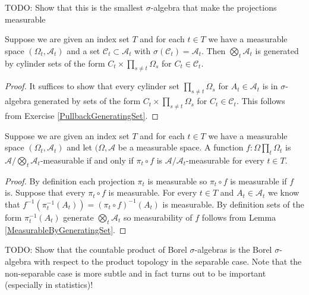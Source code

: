 TODO: Show that this is the smallest $\sigma$-algebra that make the
projections measurable


\begin{prop}\label{GeneratingSetProductSigmaAlgebra}Suppose we are given an index set $T$ and for each $t \in
  T$ we have a measurable space $(\Omega_t, \mathcal{A}_t)$ and a set $\mathcal{C}_t \subset \mathcal{A}_t$ with $\sigma(\mathcal{C}_t) = \mathcal{A}_t$.  
Then $\bigotimes_t \mathcal{A}_t$ is generated by cylinder sets of the form $C_t \times
  \prod_{s \neq t} \Omega_s$ for $C_t \in \mathcal{C}_t$.
\end{prop}
\begin{proof}
It suffices to show that every cylinder set  $\prod_{s \neq t} \Omega_s$ for $A_t \in \mathcal{A}_t$ is in $\sigma$-algebra generated by sets of the form $C_t \times
  \prod_{s \neq t} \Omega_s$ for $C_t \in \mathcal{C}_t$.  This follows from Exercise \ref{PullbackGeneratingSet}.
\end{proof}

\begin{prop}\label{MeasurableFunctionsIntoProductSigmaAlgebra}Suppose we are given an index set $T$ and for each $t \in
  T$ we have a measurable space $(\Omega_t, \mathcal{A}_t)$ and let
  $(\Omega,\mathcal{A}$ be a measurable space.  A function
  $f :\Omega \prod_t \Omega_t $ is $\mathcal{A} / \bigotimes_t
  \mathcal{A}_t$-measurable if and only if $\pi_t \circ f$ is $\mathcal{A} / \mathcal{A}_t$-measurable for every $t \in T$.
\end{prop}
\begin{proof}
By definition each projection $\pi_t$ is measurable so $\pi_t \circ f$ is measurable if $f$ is.  Suppose that every $\pi_t \circ f$ is measurable.  For every $t \in T$ and $A_t \in \mathcal{A}_t$ we know that $f^{-1}(\pi_t^{-1}(A_t)) = (\pi_t \circ f)^{-1}(A_t)$ is measurable.  By definition sets of the form $\pi_t^{-1}(A_t)$ generate $\bigotimes_t  \mathcal{A}_t$ so measurability of $f$ follows from Lemma \ref{MeasurableByGeneratingSet}.
\end{proof}

TODO: Show that the countable product of Borel $\sigma$-algebras is the Borel
$\sigma$-algebra with respect to the product topology in the separable
case.  Note that the non-separable case is more subtle and in fact
turns out to be important (especially in statistics)!

